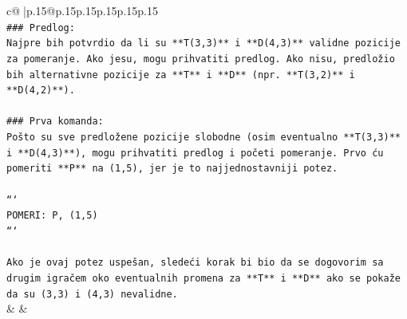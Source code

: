 \documentclass{article}
\begin{document}
{\begin{supertabular}{c@{$\;$}|p{.15\linewidth}@{}p{.15\linewidth}p{.15\linewidth}p{.15\linewidth}p{.15\linewidth}p{.15\linewidth}}
{{{\\ 
\texttt{\#\#\# Predlog:} \\
\texttt{Najpre bih potvrdio da li su **T(3,3)** i **D(4,3)** validne pozicije za pomeranje. Ako jesu, mogu prihvatiti predlog. Ako nisu, predložio bih alternativne pozicije za **T** i **D** (npr. **T(3,2)** i **D(4,2)**).} \\
\\ 
\texttt{\#\#\# Prva komanda:} \\
\texttt{Pošto su sve predložene pozicije slobodne (osim eventualno **T(3,3)** i **D(4,3)**), mogu prihvatiti predlog i početi pomeranje. Prvo ću pomeriti **P** na (1,5), jer je to najjednostavniji potez.} \\
\\ 
\texttt{```} \\
\texttt{POMERI: P, (1,5)} \\
\texttt{```} \\
\\ 
\texttt{Ako je ovaj potez uspešan, sledeći korak bi bio da se dogovorim sa drugim igračem oko eventualnih promena za **T** i **D** ako se pokaže da su (3,3) i (4,3) nevalidne.} \\
            }
        }
    }
    & & \\ \\


\end{supertabular}}
\end{document}
